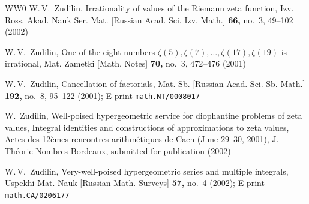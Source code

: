 \documentclass[a4paper,twoside]{article}
\numberwithin{equation}{section}
\renewcommand{\[}{\lfloor}
\renewcommand{\]}{\rfloor}
\newcommand{\<}{\langle}
\renewcommand{\>}{\rangle}
\begin{document}
\begin{thebibliography}{WW0}
W.\,V.~Zudilin,
Irrationality of values of the Riemann zeta function,
Izv. Ross. Akad. Nauk Ser. Mat. [Russian Acad. Sci. Izv. Math.]
\textbf{66,} no.~3, 49--102 (2002)

W.\,V.~Zudilin,
One of the eight numbers
$\zeta(5),\zeta(7),\dots,\zeta(17),\zeta(19)$ is irrational,
Mat. Zametki [Math. Notes] \textbf{70,} no.~3, 472--476 (2001)

W.\,V.~Zudilin,
Cancellation of factorials,
Mat. Sb. [Russian Acad. Sci. Sb. Math.] \textbf{192,} no.~8, 95--122 (2001);
E-print \texttt{math.NT/0008017}

W.~Zudilin,
Well-poised hypergeometric service
for diophantine problems of zeta values,
Integral identities and constructions of approximations
to zeta values,
Actes des 12\`emes rencontres arithm\'etiques de Caen
(June 29--30, 2001),
J. Th\'eorie Nombres Bordeaux,
submitted for publication (2002)

W.\,V.~Zudilin,
Very-well-poised hypergeometric series and multiple integrals,
Uspekhi Mat. Nauk [Russian Math. Surveys] \textbf{57,} no.~4 (2002);
E-print \texttt{math.CA/0206177}


\end{thebibliography}
\end{document}
